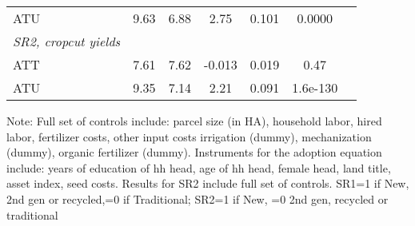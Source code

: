 \begin{table}[H]
{\begin{threeparttable}
\begin{tabular}{l cccccc}
    ATU         &        9.63&        6.88&        2.75&       0.101&      0.0000\\
    \textit{SR2, cropcut yields}&            &            &            &            &            \\
    ATT         &        7.61&        7.62&      -0.013&       0.019&        0.47\\
    ATU         &        9.35&        7.14&        2.21&       0.091&    1.6e-130\\
    \hline
    \hline
    \end{tabular}
    \begin{tablenotes}[flushleft]
    \footnotesize
    \item{Note: Full set of controls include: parcel size (in HA), household labor, hired labor, fertilizer costs, other input costs irrigation (dummy), mechanization (dummy), organic fertilizer (dummy). Instruments for the adoption equation include: years of education of hh head, age of hh head, female head, land title, asset index, seed costs. Results for SR2 include full set of controls. SR1=1 if New, 2nd gen or recycled,=0 if Traditional; SR2=1 if New, =0 2nd gen, recycled or traditional}
    \end{tablenotes}
    \end{threeparttable}
    }
\end{table}

